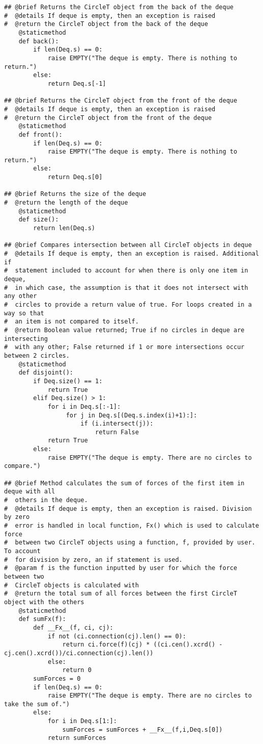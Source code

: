 \documentclass[12pt]{article}
\begin{document}
\begin{lstlisting}
## @brief Returns the CircleT object from the back of the deque
#  @details If deque is empty, then an exception is raised
#  @return the CircleT object from the back of the deque
    @staticmethod
    def back():
        if len(Deq.s) == 0:
            raise EMPTY("The deque is empty. There is nothing to return.")
        else:
            return Deq.s[-1]

## @brief Returns the CircleT object from the front of the deque
#  @details If deque is empty, then an exception is raised
#  @return the CircleT object from the front of the deque
    @staticmethod
    def front():
        if len(Deq.s) == 0:
            raise EMPTY("The deque is empty. There is nothing to return.")
        else:
            return Deq.s[0]

## @brief Returns the size of the deque
#  @return the length of the deque
    @staticmethod
    def size():
        return len(Deq.s)

## @brief Compares intersection between all CircleT objects in deque
#  @details If deque is empty, then an exception is raised. Additional if
#  statement included to account for when there is only one item in deque,
#  in which case, the assumption is that it does not intersect with any other
#  circles to provide a return value of true. For loops created in a way so that
#  an item is not compared to itself.
#  @return Boolean value returned; True if no circles in deque are intersecting
#  with any other; False returned if 1 or more intersections occur between 2 circles.
    @staticmethod
    def disjoint():
        if Deq.size() == 1:
            return True
        elif Deq.size() > 1:
            for i in Deq.s[:-1]:
                 for j in Deq.s[(Deq.s.index(i)+1):]:
                     if (i.intersect(j)):
                         return False
            return True
        else:
            raise EMPTY("The deque is empty. There are no circles to compare.")

## @brief Method calculates the sum of forces of the first item in deque with all
#  others in the deque.
#  @details If deque is empty, then an exception is raised. Division by zero
#  error is handled in local function, Fx() which is used to calculate force
#  between two CircleT objects using a function, f, provided by user. To account
#  for division by zero, an if statement is used.
#  @param f is the function inputted by user for which the force between two
#  CircleT objects is calculated with
#  @return the total sum of all forces between the first CircleT object with the others
    @staticmethod
    def sumFx(f):
        def __Fx__(f, ci, cj):
            if not (ci.connection(cj).len() == 0):
                return ci.force(f)(cj) * ((ci.cen().xcrd() - cj.cen().xcrd())/ci.connection(cj).len())
            else:
                return 0
        sumForces = 0              
        if len(Deq.s) == 0:
            raise EMPTY("The deque is empty. There are no circles to take the sum of.")
        else:
            for i in Deq.s[1:]:
                sumForces = sumForces + __Fx__(f,i,Deq.s[0])
            return sumForces



\end{lstlisting}
\end{document}
